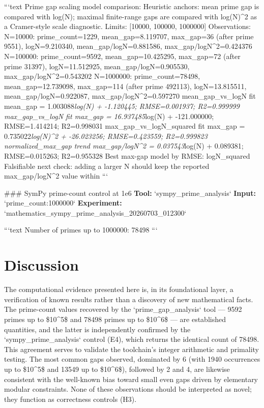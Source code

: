 \documentclass[11pt,a4paper]{article}
\begin{document}
```text
Prime gap scaling model comparison:
  Heuristic anchors: mean prime gap is compared with log(N); maximal finite-range gaps are compared with log(N)\textasciicircum{}2 as a Cramer-style scale diagnostic.
  Limits: [10000, 100000, 1000000]
  Observations:
    N=10000: prime\_count=1229, mean\_gap=8.119707, max\_gap=36 (after prime 9551), logN=9.210340, mean\_gap/logN=0.881586, max\_gap/logN\textasciicircum{}2=0.424376
    N=100000: prime\_count=9592, mean\_gap=10.425295, max\_gap=72 (after prime 31397), logN=11.512925, mean\_gap/logN=0.905530, max\_gap/logN\textasciicircum{}2=0.543202
    N=1000000: prime\_count=78498, mean\_gap=12.739098, max\_gap=114 (after prime 492113), logN=13.815511, mean\_gap/logN=0.922087, max\_gap/logN\textasciicircum{}2=0.597270
  mean\_gap\_vs\_logN fit mean\_gap = 1.003088\textit{log(N) + -1.120445; RMSE=0.001937; R2=0.999999
  max\_gap\_vs\_logN fit max\_gap = 16.937485}log(N) + -121.000000; RMSE=1.414214; R2=0.998031
  max\_gap\_vs\_logN\_squared fit max\_gap = 0.735022\textit{log(N)\textasciicircum{}2 + -26.023256; RMSE=0.423559; R2=0.999823
  normalized\_max\_gap trend max\_gap/logN\textasciicircum{}2 = 0.037543}log(N) + 0.089381; RMSE=0.015263; R2=0.955328
  Best max-gap model by RMSE: logN\_squared
  Falsifiable next check: adding a larger N should keep the reported max\_gap/logN\textasciicircum{}2 value within
```

\#\#\# SymPy prime-count control at 1e6
\textbf{Tool:} `sympy\_prime\_analysis`
\textbf{Input:} `prime\_count:1000000`
\textbf{Experiment:} `mathematics\_sympy\_prime\_analysis\_20260703\_012300`

```text
Number of primes up to 1000000: 78498
```


\section{Discussion}
The computational evidence presented here is, in its foundational layer, a verification of known results rather than a discovery of new mathematical facts. The prime-count values recovered by the `prime\_gap\_analysis` tool — 9592 primes up to \$10\textasciicircum{}5\$ and 78498 primes up to \$10\textasciicircum{}6\$ — are established quantities, and the latter is independently confirmed by the `sympy\_prime\_analysis` control (E4), which returns the identical count of 78498. This agreement serves to validate the toolchain's integer arithmetic and primality testing. The most common gaps observed, dominated by 6 (with 1940 occurrences up to \$10\textasciicircum{}5\$ and 13549 up to \$10\textasciicircum{}6\$), followed by 2 and 4, are likewise consistent with the well-known bias toward small even gaps driven by elementary modular constraints. None of these observations should be interpreted as novel; they function as correctness controls (H3).
\end{document}
